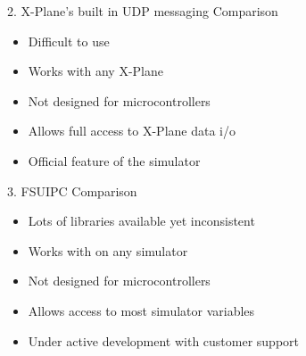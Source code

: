 \documentclass[12pt,aspectratio=169]{beamer}
\begin{document}
\begin{frame}{2. X-Plane's built in UDP messaging}
	Comparison
	\begin{itemize}
		\item <2-> Difficult to use
		\item <3-> Works with any X-Plane
		\item <4-> Not designed for microcontrollers
		\item <5-> Allows full access to X-Plane data i/o
		\item <6-> Official feature of the simulator
	\end{itemize}
\end{frame}

\begin{frame}{3. FSUIPC}
	Comparison
	\begin{itemize}
		\item <2-> Lots of libraries available yet inconsistent
		\item <3-> Works with on any simulator
		\item <4-> Not designed for microcontrollers
		\item <5-> Allows access to most simulator variables
		\item <6-> Under active development with customer support
	\end{itemize}
\end{frame}
\end{document}
